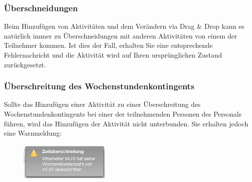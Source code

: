 \documentclass[fontsize=12pt]{scrartcl}
\begin{document}
\subsubsection{Überschneidungen}
Beim Hinzufügen von Aktivitäten und dem Verändern via Drag \& Drop kann es natürlich immer zu Überschneidungen mit anderen Aktivitäten von einem der Teilnehmer kommen. Ist dies der Fall, erhalten Sie eine entsprechende Fehlernachricht und die Aktivität wird auf Ihren ursprünglichen Zustand zurückgesetzt.

\subsubsection{Überschreitung des Wochenstundenkontingents}
Sollte das Hinzufügen einer Aktivität zu einer Überschreitung des Wochenstundenkontingents bei einer der teilnehmenden Personen des Personals führen, wird das Hinzufügen der Aktivität nicht unterbunden. Sie erhalten jedoch eine Warnmeldung: 

\begin{figure}[H]
\centering
\includegraphics[width=0.4\textwidth]{images/warning.png}
\end{figure}
\end{document}
